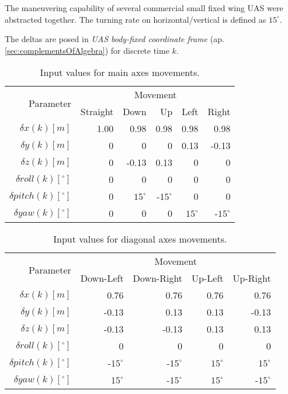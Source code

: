 The maneuvering capability of several commercial small fixed wing UAS were abstracted together. The turning rate on horizontal/vertical is defined as $15^\circ$.

The deltas are posed in \emph{UAS body-fixed coordinate frame} (ap. \ref{sec:complementsOfAlgebra}) for discrete time $k$. 

\begin{table}[H]
    \centering
    \begin{tabular}{r||r|r|r|r|r}
    	\multirow{2}{*}{Parameter} & \multicolumn{5}{c}{Movement} \\\cline{2-6} 
                &    Straight  & Down & Up & Left  & Right   \\\hline\hline
        $\delta     x(k)[m]$           &    1.00	  & 0.98  & 0.98  & 0.98 & 0.98  \\\hline
        $\delta     y(k)[m]$           &    0	      & 0	  & 0	  & 0.13 & -0.13 \\\hline
        $\delta     z(k)[m]$           &    0	      & -0.13 & 0.13  &	0	 & 0     \\\hline
        $\delta  roll(k) [^\circ]$	   &    0	      & 0	  & 0	  & 0    & 0     \\\hline
        $\delta pitch(k) [^\circ]$     &    0	      & $15^\circ$  & -$15^\circ$ & 0	 & 0     \\\hline
        $\delta   yaw(k) [^\circ]$     &    0	      & 0	  & 0	  & $15^\circ$ & -$15^\circ$ \\
    \end{tabular}
    \caption{Input values for main axes movements.}
    \label{tab:movements1}
\end{table}
\begin{table}[H]
    \centering
    \begin{tabular}{r||r|r|r|r}
    	\multirow{2}{*}{Parameter} & \multicolumn{4}{c}{Movement} \\\cline{2-5} 
                    & Down-Left & Down-Right & Up-Left  & Up-Right   \\\hline\hline
        $\delta     x(k)[m]$           & 0.76  & 0.76  & 0.76 & 0.76  \\\hline
        $\delta     y(k)[m]$           & -0.13	& 0.13	& 0.13 & -0.13 \\\hline
        $\delta     z(k)[m]$           & -0.13 & -0.13 & 0.13 & 0.13  \\\hline
        $\delta  roll(k) [^\circ]$	& 0	    & 0	    & 0    & 0     \\\hline
        $\delta pitch(k) [^\circ]$     & -$15^\circ$ & -$15^\circ$ & $15^\circ$ & $15^\circ$     \\\hline
        $\delta   yaw(k) [^\circ]$    & $15^\circ$	& -$15^\circ$	& $15^\circ$ & -$15^\circ$ \\
    \end{tabular}
    \caption{Input values for diagonal axes movements.}
    \label{tab:movements2}
\end{table}

